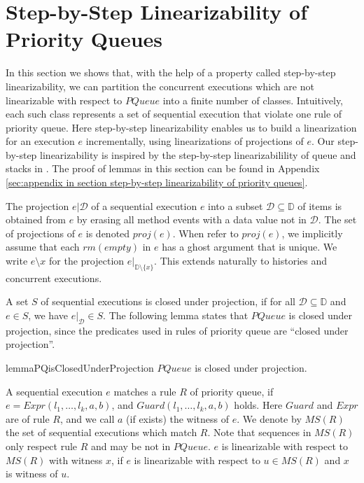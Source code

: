 \section{Step-by-Step Linearizability of Priority Queues}
\label{sec:step-by-step linearizability of priority queues}

In this section we shows that, with the help of a property called step-by-step linearizability, we can partition the concurrent executions which are not linearizable with respect to $\textit{PQueue}$ into a finite number of classes. Intuitively, each such class represents a set of sequential execution that violate one rule of priority queue. Here step-by-step linearizability enables us to build a linearization for an execution $e$ incrementally, using linearizations of projections of $e$. Our step-by-step linearizability is inspired by the step-by-step linearizabilility of queue and stacks in \cite{Bouajjani:2015}. The proof of lemmas in this section can be found in Appendix \ref{sec:appendix in section step-by-step linearizability of priority queues}.

The projection $e \vert{\mathcal{D}}$ of a sequential execution $e$ into a subset $\mathcal{D} \subseteq \mathbb{D}$ of items is obtained from $e$ by erasing all method events with a data value not in $\mathcal{D}$. The set of projections of $e$ is denoted $\textit{proj}(e)$. When refer to $\textit{proj}(e)$, we implicitly assume that each $\textit{rm}(\textit{empty})$ in $e$ has a ghost argument that is unique. We write $e \setminus x$ for the projection $e \vert_{ \mathbb{D} \setminus \{ x \} }$. This extends naturally to histories and concurrent executions.

A set $S$ of sequential executions is closed under projection, if for all $\mathcal{D} \subseteq \mathbb{D}$ and $e \in S$, we have $e \vert_{ \mathcal{D} } \in S$. The following lemma states that $\textit{PQueue}$ is closed under projection, since the predicates used in rules of priority queue are ``closed under projection''.

\begin{restatable}{lemma}{PQisClosedUnderProjection}
\label{lemma:PQ is closed under projection}
$\textit{PQueue}$ is closed under projection.
\end{restatable}

A sequential execution $e$ matches a rule $R$ of priority queue, if $e=\textit{Expr}(l_1, \ldots, l_k,a,b)$, and $\textit{Guard}(l_1, \ldots, l_k,a,b)$ holds. Here $\textit{Guard}$ and $\textit{Expr}$ are of rule $R$, and we call $a$ (if exists) the witness of $e$. We denote by $\textit{MS}(R)$ the set of sequential executions which match $R$. Note that sequences in $\textit{MS}(R)$ only respect rule $R$ and may be not in $\textit{PQueue}$. $e$ is linearizable with respect to $\textit{MS}(R)$ with witness $x$, if $e$ is linearizable with respect to $u \in \textit{MS}(R)$ and $x$ is witness of $u$.

